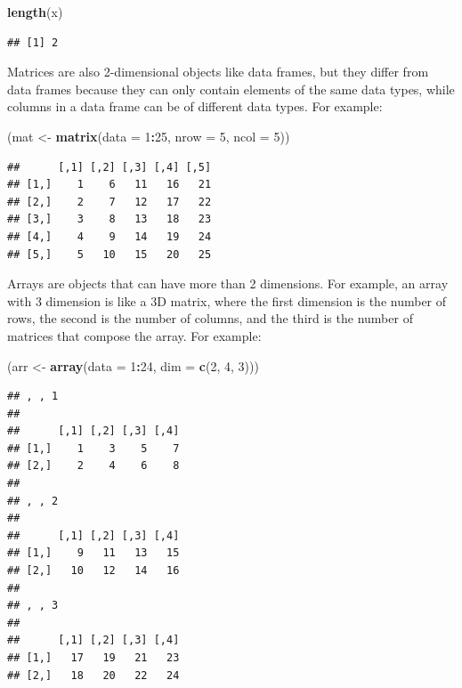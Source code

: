 \documentclass[
]{book}
\newenvironment{Shaded}{\begin{snugshade}}{\end{snugshade}}
\newcommand{\AttributeTok}[1]{\textcolor[rgb]{0.13,0.29,0.53}{#1}}
\newcommand{\DecValTok}[1]{\textcolor[rgb]{0.00,0.00,0.81}{#1}}
\newcommand{\FunctionTok}[1]{\textcolor[rgb]{0.13,0.29,0.53}{\textbf{#1}}}
\newcommand{\NormalTok}[1]{#1}
\newcommand{\OtherTok}[1]{\textcolor[rgb]{0.56,0.35,0.01}{#1}}
\newcommand{\SpecialCharTok}[1]{\textcolor[rgb]{0.81,0.36,0.00}{\textbf{#1}}}
\begin{document}
\begin{Shaded}
\begin{Highlighting}[]
\FunctionTok{length}\NormalTok{(x)}
\end{Highlighting}
\end{Shaded}

\begin{verbatim}
## [1] 2
\end{verbatim}

Matrices are also 2-dimensional objects like data frames, but they differ from
data frames because they can only contain elements of the same data types, while
columns in a data frame can be of different data types. For example:

\begin{Shaded}
\begin{Highlighting}[]
\NormalTok{(mat }\OtherTok{\textless{}{-}} \FunctionTok{matrix}\NormalTok{(}\AttributeTok{data =} \DecValTok{1}\SpecialCharTok{:}\DecValTok{25}\NormalTok{, }\AttributeTok{nrow =} \DecValTok{5}\NormalTok{, }\AttributeTok{ncol =} \DecValTok{5}\NormalTok{))}
\end{Highlighting}
\end{Shaded}

\begin{verbatim}
##      [,1] [,2] [,3] [,4] [,5]
## [1,]    1    6   11   16   21
## [2,]    2    7   12   17   22
## [3,]    3    8   13   18   23
## [4,]    4    9   14   19   24
## [5,]    5   10   15   20   25
\end{verbatim}

Arrays are objects that can have more than 2 dimensions. For example, an array
with 3 dimension is like a 3D matrix, where the first dimension is the number of
rows, the second is the number of columns, and the third is the number of
matrices that compose the array. For example:

\begin{Shaded}
\begin{Highlighting}[]
\NormalTok{(arr }\OtherTok{\textless{}{-}} \FunctionTok{array}\NormalTok{(}\AttributeTok{data =} \DecValTok{1}\SpecialCharTok{:}\DecValTok{24}\NormalTok{, }\AttributeTok{dim =} \FunctionTok{c}\NormalTok{(}\DecValTok{2}\NormalTok{, }\DecValTok{4}\NormalTok{, }\DecValTok{3}\NormalTok{)))}
\end{Highlighting}
\end{Shaded}

\begin{verbatim}
## , , 1
## 
##      [,1] [,2] [,3] [,4]
## [1,]    1    3    5    7
## [2,]    2    4    6    8
## 
## , , 2
## 
##      [,1] [,2] [,3] [,4]
## [1,]    9   11   13   15
## [2,]   10   12   14   16
## 
## , , 3
## 
##      [,1] [,2] [,3] [,4]
## [1,]   17   19   21   23
## [2,]   18   20   22   24
\end{verbatim}
\end{document}
